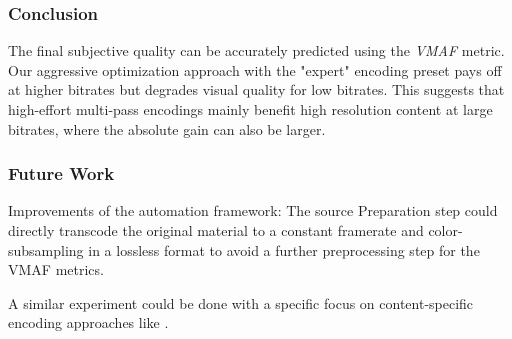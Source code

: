 \subsubsection{Conclusion}
The final subjective quality can be accurately predicted using the \textit{VMAF} metric.
Our aggressive optimization approach with the "expert" encoding preset pays off at higher bitrates but degrades visual quality for low bitrates. This suggests that high-effort multi-pass encodings mainly benefit high resolution content at large bitrates, where the absolute gain can also be larger.


\subsubsection{Future Work}
Improvements of the automation framework: The source Preparation step could directly transcode the original material to a constant framerate and color-subsampling in a lossless format to avoid a further preprocessing step for the VMAF metrics.


A similar experiment could be done with a specific focus on content-specific encoding approaches like \cite{cock:2016:titleencode}.

